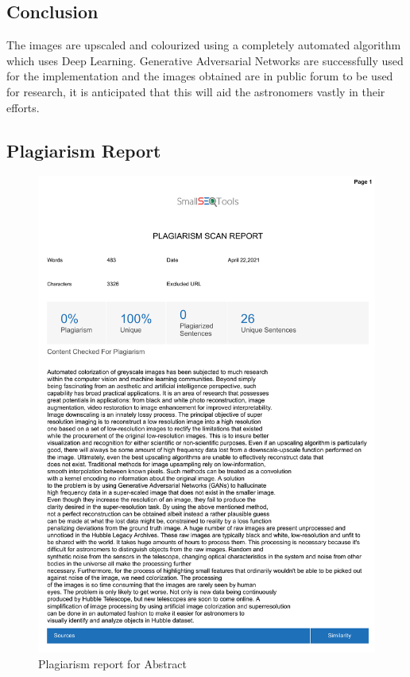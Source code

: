 \documentclass[oneside,a4paper,12pt]{report}
\begin{document}
\section{Conclusion}
\hspace*{0.25 in}The images are upscaled and colourized using a completely automated algorithm which uses Deep Learning. Generative Adversarial Networks are  successfully used for the implementation and the images obtained are in public forum to be used for research, it is anticipated that this will aid the astronomers vastly in their efforts.





\begin{appendices}

\chapter{Plagiarism Report }


\begin{figure}
	\centering
    \includegraphics[scale=0.7]{plagiarism/abstract.pdf}
    \caption{Plagiarism report for Abstract}
    \label{PlagiarismAbstract}
\end{figure}


\end{appendices}
\end{document}
